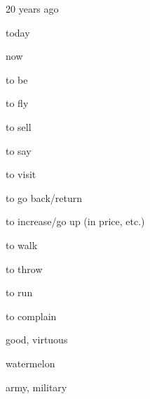 \documentclass[avery5371,grid,frame]{flashcards}
\begin{document}
\begin{flashcard}{\LARGE 20 years ago}
\LARGE {}
\end{flashcard}
\begin{flashcard}{\LARGE today}
\LARGE {}
\end{flashcard}
\begin{flashcard}{\LARGE now}
\LARGE {}
\end{flashcard}
\begin{flashcard}{\LARGE to be}
\LARGE {}
\end{flashcard}
\begin{flashcard}{\LARGE to fly}
\LARGE {}
\end{flashcard}
\begin{flashcard}{\LARGE to sell}
\LARGE {}
\end{flashcard}
\begin{flashcard}{\LARGE to say}
\LARGE {}
\end{flashcard}
\begin{flashcard}{\LARGE to visit}
\LARGE {}
\end{flashcard}
\begin{flashcard}{\LARGE to go back/return}
\LARGE {}
\end{flashcard}
\begin{flashcard}{\LARGE to increase/go up (in price, etc.)}
\LARGE {}
\end{flashcard}
\begin{flashcard}{\LARGE to walk}
\LARGE {}
\end{flashcard}
\begin{flashcard}{\LARGE to throw}
\LARGE {}
\end{flashcard}
\begin{flashcard}{\LARGE to run}
\LARGE {}
\end{flashcard}
\begin{flashcard}{\LARGE to complain}
\LARGE {}
\end{flashcard}
\begin{flashcard}{\LARGE good, virtuous}
\LARGE {}
\end{flashcard}
\begin{flashcard}{\LARGE watermelon}
\LARGE {}
\end{flashcard}
\begin{flashcard}{\LARGE army, military}
\LARGE {}
\end{flashcard}
\end{document}
